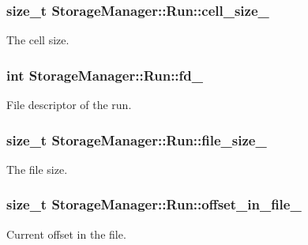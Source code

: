 \subsubsection[{cell\+\_\+size\+\_\+}]{\setlength{\rightskip}{0pt plus 5cm}size\+\_\+t Storage\+Manager\+::\+Run\+::cell\+\_\+size\+\_\+\hspace{0.3cm}{\ttfamily [private]}}\label{classStorageManager_1_1Run_a085f35ce859c791f5beda7f64b22f053}
The cell size. \hypertarget{classStorageManager_1_1Run_ae40b20b29380fd5bebb8904c81a32279}{}
\subsubsection[{fd\+\_\+}]{\setlength{\rightskip}{0pt plus 5cm}int Storage\+Manager\+::\+Run\+::fd\+\_\+\hspace{0.3cm}{\ttfamily [private]}}\label{classStorageManager_1_1Run_ae40b20b29380fd5bebb8904c81a32279}
File descriptor of the run. \hypertarget{classStorageManager_1_1Run_adbc098acabc17a7958eb7a4067bdadcf}{}
\subsubsection[{file\+\_\+size\+\_\+}]{\setlength{\rightskip}{0pt plus 5cm}size\+\_\+t Storage\+Manager\+::\+Run\+::file\+\_\+size\+\_\+\hspace{0.3cm}{\ttfamily [private]}}\label{classStorageManager_1_1Run_adbc098acabc17a7958eb7a4067bdadcf}
The file size. \hypertarget{classStorageManager_1_1Run_a6283a34a922c61fdbb863a61b1c9005b}{}
\subsubsection[{offset\+\_\+in\+\_\+file\+\_\+}]{\setlength{\rightskip}{0pt plus 5cm}size\+\_\+t Storage\+Manager\+::\+Run\+::offset\+\_\+in\+\_\+file\+\_\+\hspace{0.3cm}{\ttfamily [private]}}\label{classStorageManager_1_1Run_a6283a34a922c61fdbb863a61b1c9005b}
Current offset in the file. \hypertarget{classStorageManager_1_1Run_ac53033fb4e873a77608550a8787c06a8}{}
